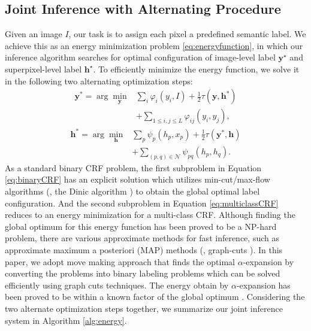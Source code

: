 \subsection{Joint Inference with Alternating Procedure}
\label{sec:inference}
Given an image $I$, our task is to assign each pixel a predefined semantic label.
We achieve this as an energy minimization problem \eqref{eq:energyfunction}, in which our inference algorithm searches for optimal configuration of image-level label $\boldsymbol{y}^\star$ and superpixel-level label $\boldsymbol{h}^\star$.
To efficiently minimize the energy function, we solve it in the following two alternating optimization steps:
\begin{equation}
    \label{eq:binaryCRF}
    \begin{aligned}
        \boldsymbol{y}^* = \arg\min_{\boldsymbol{y}} &\sum_{i} {\varphi_{i}(y_i,I)} + \frac{1}{2} \tau(\boldsymbol{y},\boldsymbol{h}^*) \\ &+ \sum_{1 \le i,j \le L} {\varphi_{ij}(y_i,y_j)},
    \end{aligned}
\end{equation}
\begin{equation}
    \label{eq:multiclassCRF}
    \begin{aligned}
        \boldsymbol{h}^* = \arg\min_{\boldsymbol{h}} &\sum_{p} {\psi_{p}(h_p,x_p)} + \frac{1}{2} \tau(\boldsymbol{y}^*,\boldsymbol{h}) \\ &+ \sum_{(p,q) \in \mathcal{N}}{\psi_{pq}(h_p,h_q)}.
    \end{aligned}
\end{equation}
As a standard binary CRF problem, the first subproblem in Equation \eqref{eq:binaryCRF} has an explicit solution which utilizes min-cut/max-flow algorithms (\eg, the Dinic algorithm \cite{dinits1970algorithm}) to obtain the global optimal label configuration.
And the second subproblem in Equation \eqref{eq:multiclassCRF} reduces to an energy minimization for a multi-class CRF.
Although finding the global optimum for this energy function has been proved to be a NP-hard problem, there are various approximate methods for fast inference, such as approximate maximum a posteriori (MAP) methods (\eg, graph-cuts \cite{boykov2001fast}).
In this paper, we adopt move making approach \cite{boykov2001fast} that finds the optimal $\alpha$-expansion \cite{boykov2001fast,kolmogorov2004energy} by converting the problems into binary labeling  problems which can be solved efficiently using graph cuts techniques.
The energy obtain by $\alpha$-expansion has been proved to be within a known factor of the global optimum \cite{boykov2001fast}. Considering the two alternate optimization steps together, we summarize our joint inference system in Algorithm \ref{alg:energy}.


